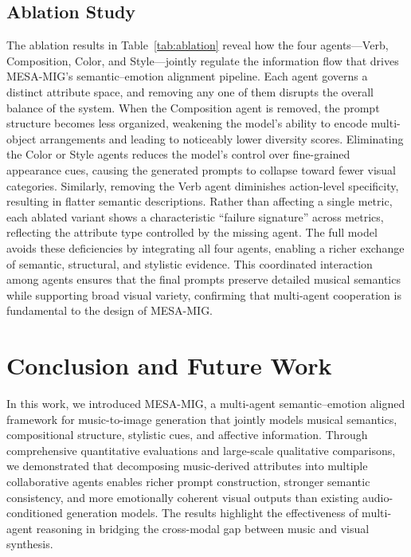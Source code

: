 \documentclass[letterpaper]{article}
\begin{document}
\subsection{Ablation Study}
The ablation results in Table~\ref{tab:ablation} reveal how the four agents—Verb, Composition, Color, and Style—jointly regulate the information flow that drives MESA-MIG’s semantic–emotion alignment pipeline. Each agent governs a distinct attribute space, and removing any one of them disrupts the overall balance of the system. When the Composition agent is removed, the prompt structure becomes less organized, weakening the model’s ability to encode multi-object arrangements and leading to noticeably lower diversity scores. Eliminating the Color or Style agents reduces the model’s control over fine-grained appearance cues, causing the generated prompts to collapse toward fewer visual categories. Similarly, removing the Verb agent diminishes action-level specificity, resulting in flatter semantic descriptions.
Rather than affecting a single metric, each ablated variant shows a characteristic “failure signature” across metrics, reflecting the attribute type controlled by the missing agent. The full model avoids these deficiencies by integrating all four agents, enabling a richer exchange of semantic, structural, and stylistic evidence. This coordinated interaction among agents ensures that the final prompts preserve detailed musical semantics while supporting broad visual variety, confirming that multi-agent cooperation is fundamental to the design of MESA-MIG.

\section{Conclusion and Future Work}
In this work, we introduced MESA-MIG, a multi-agent semantic–emotion aligned framework for music-to-image generation that jointly models musical semantics, compositional structure, stylistic cues, and affective information. Through comprehensive quantitative evaluations and large-scale qualitative comparisons, we demonstrated that decomposing music-derived attributes into multiple collaborative agents enables richer prompt construction, stronger semantic consistency, and more emotionally coherent visual outputs than existing audio-conditioned generation models. The results highlight the effectiveness of multi-agent reasoning in bridging the cross-modal gap between music and visual synthesis.
\end{document}

